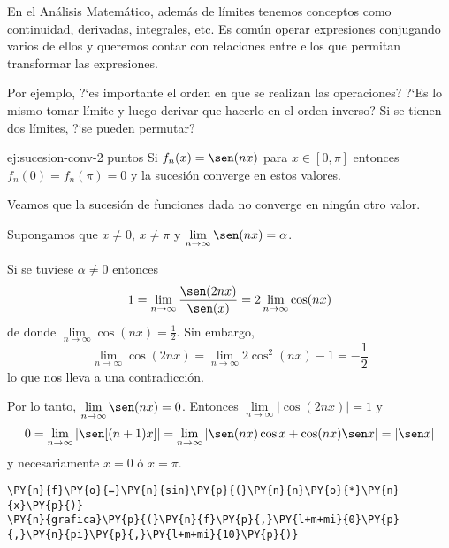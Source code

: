 En el Análisis Matemático, además de límites tenemos conceptos como continuidad, derivadas, integrales, etc.
Es común operar expresiones conjugando varios de ellos y queremos contar con relaciones entre ellos que permitan 
transformar las expresiones. 

Por ejemplo, ?`es importante el orden en que se realizan  las operaciones?
?`Es lo mismo tomar límite y luego derivar que hacerlo en el orden inverso? 
Si se tienen dos límites, ?`se pueden permutar?

\begin{ejemplo}{ej:sucesion-conv-2 puntos}
Si $f_n(x)=\sen(nx)$ para $x\in [0,\pi]$ entonces $f_n(0)=f_n(\pi)=0$ y la sucesión converge en estos valores.

Veamos que la sucesión de funciones dada no converge en ningún otro valor. 

Supongamos que $x\neq0$, $x\neq \pi$ y $\lim\limits_{n \to \infty}\sen(nx)=\alpha$. 

Si se tuviese $\alpha\neq 0$ entonces
\[
1=\lim\limits_{n \to \infty}\frac{\sen(2nx)}{\sen(x)}=2\lim\limits_{n \to \infty}\cos(nx)
\]
de donde $\lim\limits_{n \to \infty} \cos(nx)=\frac{1}{2}$.
Sin embargo, 
\[
\lim\limits_{n \to \infty}\cos(2nx)=
\lim\limits_{n \to \infty}2\cos^2(nx)-1=-\frac{1}{2}
\]
lo que nos lleva a una contradicción. 

Por lo tanto, $\lim\limits_{n \to \infty}\sen(nx)=0$.
Entonces 
$\lim\limits_{n \to \infty}|\cos(2nx)|=1
$
y 
\[
0=\lim\limits_{n \to \infty} |\sen[(n+1)x]|=
\lim\limits_{n \to \infty} |\sen(nx)\cos x+\cos(nx)\sen x|=|\sen x|
\]
y necesariamente  $x=0$ \'o $x=\pi$.

 \begin{tcolorbox}[breakable, size=fbox, boxrule=1pt, pad at break*=1mm,colback=cellbackground, colframe=cellborder]
\begin{Verbatim}[commandchars=\\\{\}]
\PY{n}{f}\PY{o}{=}\PY{n}{sin}\PY{p}{(}\PY{n}{n}\PY{o}{*}\PY{n}{x}\PY{p}{)}
\PY{n}{grafica}\PY{p}{(}\PY{n}{f}\PY{p}{,}\PY{l+m+mi}{0}\PY{p}{,}\PY{n}{pi}\PY{p}{,}\PY{l+m+mi}{10}\PY{p}{)}
\end{Verbatim}
\end{tcolorbox}

    \begin{center}
    \end{center}
    { \hspace*{\fill} \\}
\end{ejemplo}


